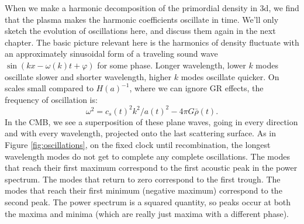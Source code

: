 When we make a harmonic decomposition of the primordial density in 3d, we find that the plasma makes the harmonic coefficients oscillate in time.  We'll only sketch the evolution of oscillations here, and discuss them again in the next chapter.  The basic picture relevant here is the harmonics of density fluctuate with an approximately sinusoidal form of a traveling sound wave $\sin(k x - \omega(k) t + \varphi)$ for some phase.  Longer wavelength, lower $k$ modes oscillate slower and shorter wavelength, higher $k$ modes oscillate quicker.  On scales small compared to $H(a)^{-1}$, where we can ignore GR effects, the frequency of oscillation is: 
\begin{equation}
  \omega^2 = c_s(t)^2 k^2/a(t)^2  - 4\pi G \bar \rho(t).
\end{equation}
In the CMB, we see a superposition of these plane waves, going in every direction and with every wavelength, projected onto the last scattering surface.  As in Figure \ref{fig:oscillations}, on the fixed clock until recombination, the longest wavelength modes do not get to complete any complete oscillations.  The modes that reach their first maximum correspond to the first acoustic peak in the power spectrum.  The modes that return to zero correspond to the first trough.  The modes that reach their first minimum (negative maximum) correspond to the second peak.  The power spectrum is a squared quantity, so peaks occur at both the maxima and minima (which are really just maxima with a different phase).  
 
